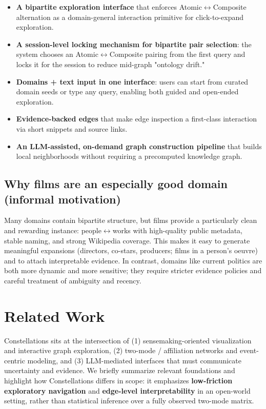 \begin{itemize}[leftmargin=*]

\item \textbf{A bipartite exploration interface} that enforces Atomic\(\leftrightarrow\)Composite alternation as a domain-general interaction primitive for click-to-expand exploration.

\item \textbf{A session-level locking mechanism for bipartite pair selection}: the system chooses an Atomic\(\leftrightarrow\)Composite pairing from the first query and locks it for the session to reduce mid-graph "ontology drift."

\item \textbf{Domains + text input in one interface}: users can start from curated domain seeds or type any query, enabling both guided and open-ended exploration.

\item \textbf{Evidence-backed edges} that make edge inspection a first-class interaction via short snippets and source links.

\item \textbf{An LLM-assisted, on-demand graph construction pipeline} that builds local neighborhoods without requiring a precomputed knowledge graph.

\end{itemize}

\subsection{Why films are an especially good domain (informal motivation)}

Many domains contain bipartite structure, but films provide a particularly clean and rewarding instance: people\(\leftrightarrow\)works with high-quality public metadata, stable naming, and strong Wikipedia coverage. This makes it easy to generate meaningful expansions (directors, co-stars, producers; films in a person's oeuvre) and to attach interpretable evidence. In contrast, domains like current politics are both more dynamic and more sensitive; they require stricter evidence policies and careful treatment of ambiguity and recency.

\section{Related Work}

Constellations sits at the intersection of (1) sensemaking-oriented visualization and interactive graph exploration, (2) two-mode / affiliation networks and event-centric modeling, and (3) LLM-mediated interfaces that must communicate uncertainty and evidence. We briefly summarize relevant foundations and highlight how Constellations differs in scope: it emphasizes \textbf{low-friction exploratory navigation} and \textbf{edge-level interpretability} in an open-world setting, rather than statistical inference over a fully observed two-mode matrix.

